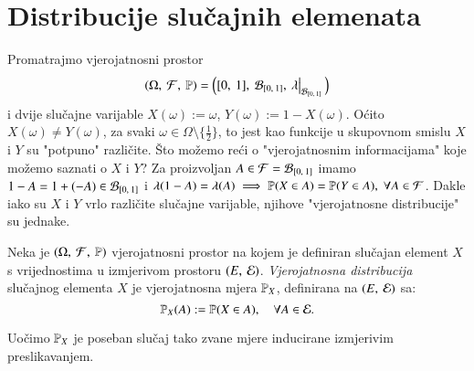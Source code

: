 
\chapter{Distribucije slu\v cajnih elemenata} \label{dist_sl_elem}

\begin{pr}  \label{pr:5.1}
    Promatrajmo vjerojatnosni prostor
    \begin{equation*}
        \vjerojatnosniProstor = \Big(\segment{0}{1}, \: \borel{\segment{0}{1}}, \: \restr{\lambda}{\borel{\segment{0}{1}}}\Big)
    \end{equation*}
    i dvije slu\v cajne varijable $X (\omega) := \omega$, $Y (\omega) := 1 - X (\omega)$.
    O\' cito $X(\omega) \neq Y(\omega)$, za svaki $\omega \in \Omega \setminus \{ \frac{1}{2} \}$, to jest kao funkcije u skupovnom smislu $X$ i $Y$ su "potpuno" razli\v cite.
    \v Sto mo\v zemo re\' ci o "vjerojatnosnim informacijama" koje mo\v zemo saznati o $X$ i $Y$?
    Za proizvoljan $A \in \mathcal{F} = \mathcal{B}_{[{0}, \:{1}]}$ imamo $1-A = 1 + (-A) \in \mathcal{B}_{[{0}, \:{1}]}$ i $\lambda (1 - A) = \lambda (A) \implies \mathbb{P}({X \in A}) = \mathbb{P}({Y \in A}), \; \forall A \in \mathcal{F}$.
    Dakle iako su $X$ i $Y$ vrlo razli\v cite slu\v cajne varijable, njihove "vjerojatnosne distribucije" su jednake.
\end{pr}

\begin{defn}    \label{defn:5.2}
    Neka je $(\Omega, \: \mathcal{F}, \: \mathbb{P})$ vjerojatnosni prostor na kojem je definiran slu\v cajan element $X$ s vrijednostima u izmjerivom prostoru $({E}, \: {\mathcal{E}})$.
    \emph{Vjerojatnosna distribucija} slu\v cajnog elementa $X$ je vjerojatnosna mjera $\mathbb{P}_X$, definirana na $({E}, \: {\mathcal{E}})$
    sa:
    \begin{equation*}
        \mathbb{P}_X (A) := \mathbb{P}(X \in A), \quad \forall A \in \mathcal{E}.
    \end{equation*}
\end{defn}

Uo\v cimo $\mathbb{P}_X$ je poseban slu\v caj tako zvane mjere inducirane izmjerivim preslikavanjem.

